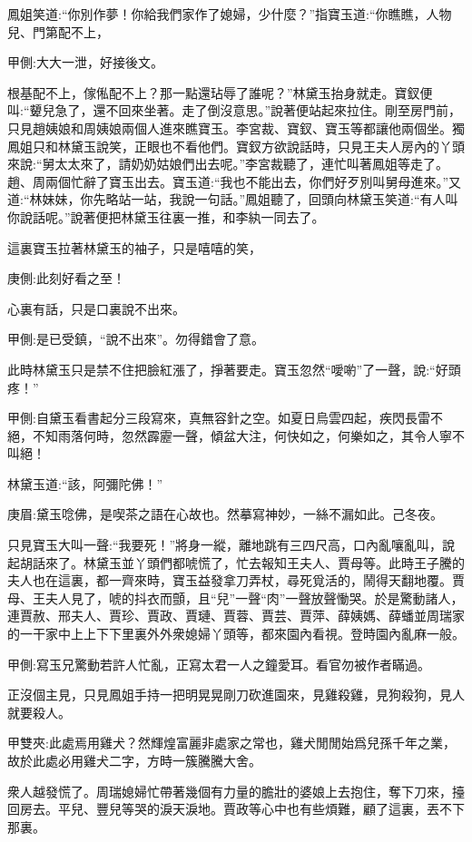 \begin{parag}
    鳳姐笑道:“你別作夢！你給我們家作了媳婦，少什麼？”指寶玉道:“你瞧瞧，人物兒、門第配不上，\begin{note}甲側:大大一泄，好接後文。\end{note}根基配不上，傢俬配不上？那一點還玷辱了誰呢？”林黛玉抬身就走。寶釵便叫:“顰兒急了，還不回來坐著。走了倒沒意思。”說著便站起來拉住。剛至房門前，只見趙姨娘和周姨娘兩個人進來瞧寶玉。李宮裁、寶釵、寶玉等都讓他兩個坐。獨鳳姐只和林黛玉說笑，正眼也不看他們。寶釵方欲說話時，只見王夫人房內的丫頭來說:“舅太太來了，請奶奶姑娘們出去呢。”李宮裁聽了，連忙叫著鳳姐等走了。趙、周兩個忙辭了寶玉出去。寶玉道:“我也不能出去，你們好歹別叫舅母進來。”又道:“林妹妹，你先略站一站，我說一句話。”鳳姐聽了，回頭向林黛玉笑道:“有人叫你說話呢。”說著便把林黛玉往裏一推，和李紈一同去了。
\end{parag}


\begin{parag}
    這裏寶玉拉著林黛玉的袖子，只是嘻嘻的笑，\begin{note}庚側:此刻好看之至！\end{note}心裏有話，只是口裏說不出來。\begin{note}甲側:是已受鎮，“說不出來”。勿得錯會了意。\end{note}此時林黛玉只是禁不住把臉紅漲了，掙著要走。寶玉忽然“噯喲”了一聲，說:“好頭疼！”\begin{note}甲側:自黛玉看書起分三段寫來，真無容針之空。如夏日烏雲四起，疾閃長雷不絕，不知雨落何時，忽然霹靂一聲，傾盆大注，何快如之，何樂如之，其令人寧不叫絕！\end{note}林黛玉道:“該，阿彌陀佛！”\begin{note}庚眉:黛玉唸佛，是喫茶之語在心故也。然摹寫神妙，一絲不漏如此。己冬夜。\end{note}只見寶玉大叫一聲:“我要死！”將身一縱，離地跳有三四尺高，口內亂嚷亂叫，說起胡話來了。林黛玉並丫頭們都唬慌了，忙去報知王夫人、賈母等。此時王子騰的夫人也在這裏，都一齊來時，寶玉益發拿刀弄杖，尋死覓活的，鬧得天翻地覆。賈母、王夫人見了，唬的抖衣而顫，且“兒”一聲“肉”一聲放聲慟哭。於是驚動諸人，連賈赦、邢夫人、賈珍、賈政、賈璉、賈蓉、賈芸、賈萍、薛姨媽、薛蟠並周瑞家的一干家中上上下下里裏外外衆媳婦丫頭等，都來園內看視。登時園內亂麻一般。\begin{note}甲側:寫玉兄驚動若許人忙亂，正寫太君一人之鐘愛耳。看官勿被作者瞞過。\end{note}正沒個主見，只見鳳姐手持一把明晃晃剛刀砍進園來，見雞殺雞，見狗殺狗，見人就要殺人。\begin{note}甲雙夾:此處焉用雞犬？然輝煌富麗非處家之常也，雞犬閒閒始爲兒孫千年之業，故於此處必用雞犬二字，方時一簇騰騰大舍。\end{note}衆人越發慌了。周瑞媳婦忙帶著幾個有力量的膽壯的婆娘上去抱住，奪下刀來，擡回房去。平兒、豐兒等哭的淚天淚地。賈政等心中也有些煩難，顧了這裏，丟不下那裏。
\end{parag}



